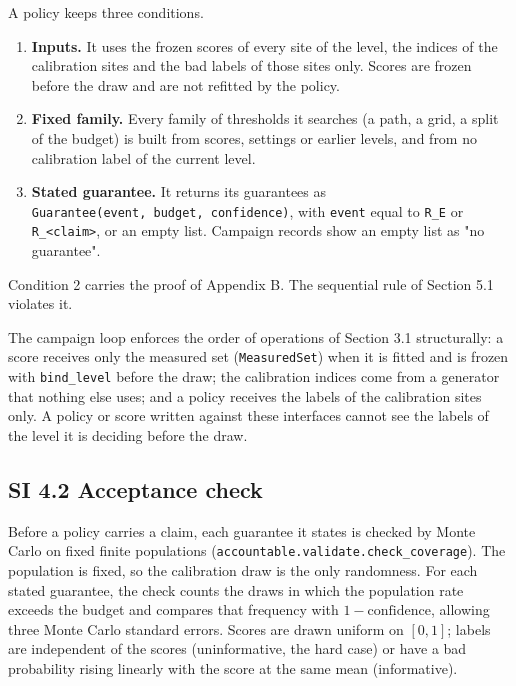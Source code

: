\documentclass{iopjournal}
\providecommand{\tightlist}{\setlength{\itemsep}{0pt}\setlength{\parskip}{0pt}}
\begin{document}
A policy keeps three conditions.

\begin{enumerate}
\def\labelenumi{\arabic{enumi}.}
\tightlist
\item
  \textbf{Inputs.} It uses the frozen scores of every site of the level, the indices of the calibration sites and the bad labels of those sites only. Scores are frozen before the draw and are not refitted by the policy.
\item
  \textbf{Fixed family.} Every family of thresholds it searches (a path, a grid, a split of the budget) is built from scores, settings or earlier levels, and from no calibration label of the current level.
\item
  \textbf{Stated guarantee.} It returns its guarantees as \texttt{Guarantee(event,\ budget,\ confidence)}, with \texttt{event} equal to \texttt{R\_E} or \texttt{R\_\textless{}claim\textgreater{}}, or an empty list. Campaign records show an empty list as "no guarantee".
\end{enumerate}

Condition 2 carries the proof of Appendix B. The sequential rule of Section 5.1 violates it.

The campaign loop enforces the order of operations of Section 3.1 structurally: a score receives only the measured set (\texttt{MeasuredSet}) when it is fitted and is frozen with \texttt{bind\_level} before the draw; the calibration indices come from a generator that nothing else uses; and a policy receives the labels of the calibration sites only. A policy or score written against these interfaces cannot see the labels of the level it is deciding before the draw.

\hypertarget{si-4.2-acceptance-check}{%
\subsection*{SI 4.2 Acceptance check}\label{si-4.2-acceptance-check}}

Before a policy carries a claim, each guarantee it states is checked by Monte Carlo on fixed finite populations (\texttt{accountable.validate.check\_coverage}). The population is fixed, so the calibration draw is the only randomness. For each stated guarantee, the check counts the draws in which the population rate exceeds the budget and compares that frequency with \(1 - \text{confidence}\), allowing three Monte Carlo standard errors. Scores are drawn uniform on \([0, 1]\); labels are independent of the scores (uninformative, the hard case) or have a bad probability rising linearly with the score at the same mean (informative).
\end{document}

